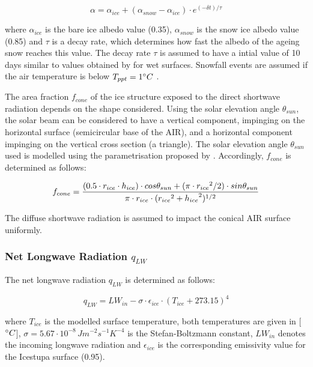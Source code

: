 \documentclass[utf8]{frontiersSCNS} %
\begin{document}
\begin{equation} \alpha=\alpha_{ice}+(\alpha_{snow}-\alpha_{ice}) \cdot e^{(-\delta t)/\tau} \label{eqn:a}
\end{equation}

where $\alpha_{ice}$ is the bare ice albedo value (0.35), $\alpha_{snow}$ is the snow ice albedo value (0.85) and $\tau$
is a decay rate, which determines how fast the albedo of the ageing snow reaches this value.  The decay rate $\tau$ is
assumed to have a intial value of 10 days similar to values obtained by \cite{Schmidt_2017} for wet surfaces. Snowfall
events are assumed if the air temperature is below $T_{ppt}=1 \degree C$ \citep{FujitaAgeta_2000}.

The area fraction $f_{cone}$ of the ice structure exposed to the direct shortwave radiation depends on the shape
considered. Using the solar elevation angle $\theta_{sun}$,  the solar beam can be considered to have a vertical
component, impinging on the horizontal surface (semicircular base of the AIR), and a horizontal component impinging on
the vertical cross section (a triangle). The solar elevation angle $\theta_{sun}$ used is modelled using the
parametrisation proposed by \cite{Woolf_1968}. Accordingly, $f_{cone}$ is determined as follows:

\begin{equation} \begin{split} f_{cone}& =\frac{(0.5 \cdot r_{ice} \cdot h_{ice}) \cdot cos \theta_{sun} +(\pi \cdot
			{r_{ice}}^2/2) \cdot sin \theta_{sun} }{\pi \cdot r_{ice} \cdot ({r_{ice}}^2+{h_{ice}}^2)^{1/2}}\\ \end{split}
	\label{eqn:f_{cone}} \end{equation}

The diffuse shortwave radiation is assumed to impact the conical AIR surface uniformly.

\subsubsection{Net Longwave Radiation \texorpdfstring{$q_{LW}$}{Lg}}

The net longwave radiation $q_{LW}$ is determined as follows:

\begin{equation} q_{LW}= LW_{in}-\sigma \cdot \epsilon_{ice} \cdot {(T_{ice}+ 273.15)}^4
	\label{eqn:LW} \end{equation}

where $T_{ice}$ is the modelled surface temperature, both temperatures are given in [$\degree C$], $\sigma=5.67\cdot
	10^{-8}\,Jm^{-2}s^{-1}K^{-4}$ is the Stefan-Boltzmann constant, $LW_{in}$ denotes the incoming longwave radiation and
$\epsilon_{ice}$ is the corresponding emissivity value for the Icestupa surface (0.95).
\end{document}
